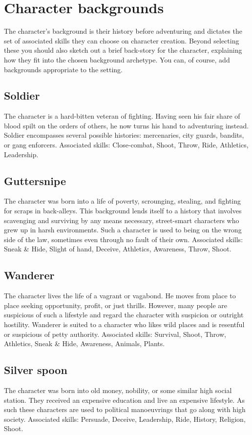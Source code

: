 \documentclass[a4paper,10pt,oneside]{book}
\begin{document}
\section{Character backgrounds}
\label{sec:backgrounds}
The character's background is their history before adventuring and dictates the set of associated skills they can choose on character creation. Beyond selecting these you should also sketch out a brief back-story for the character, explaining how they fit into the chosen background archetype. You can, of course, add backgrounds appropriate to the setting.

\subsection{Soldier}
The character is a hard-bitten veteran of fighting. Having seen his fair share of blood spilt on the orders of others, he now turns his hand to adventuring instead. Soldier encompasses several possible histories: mercenaries, city guards, bandits, or gang enforcers. Associated skills: Close-combat, Shoot, Throw, Ride, Athletics, Leadership.

\subsection{Guttersnipe}
The character was born into a life of poverty, scrounging, stealing, and fighting for scraps in back-alleys. This background lends itself to a history that involves scavenging and surviving by any means necessary, street-smart characters who grew up in harsh environments. Such a character is used to being on the wrong side of the law, sometimes even through no fault of their own. Associated skills: Sneak \& Hide, Slight of hand, Deceive, Athletics, Awareness, Throw, Shoot.

\subsection{Wanderer}
The character lives the life of a vagrant or vagabond. He moves from place to place seeking opportunity, profit, or just thrills. However, many people are suspicious of such a lifestyle and regard the character with suspicion or outright hostility. Wanderer is suited to a character who likes wild places and is resentful or suspicious of petty authority. Associated skills: Survival, Shoot, Throw, Athletics, Sneak \& Hide, Awareness, Animals, Plants.

\subsection{Silver spoon}
The character was born into old money, nobility, or some similar high social station. They received an expensive education and live an expensive lifestyle. As such these characters are used to political manoeuvrings that go along with high society. Associated skills: Persuade, Deceive, Leadership, Ride, History, Religion, Shoot.
\end{document}
